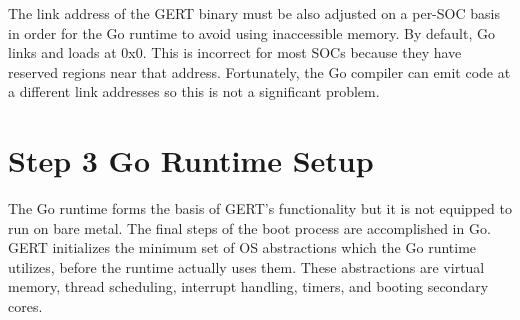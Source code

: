 The link address of the GERT binary must be also adjusted on a per-SOC basis in order for the Go
runtime to avoid using inaccessible memory. By default, Go links and loads at 0x0. This is incorrect
for most SOCs because they have reserved regions near that address. Fortunately, the Go compiler can
emit code at a different link addresses so this is not a significant problem.



\section{Step 3 Go Runtime Setup}

The Go runtime forms the basis of GERT's functionality but it is not equipped to
run on bare metal. The final steps of the boot process are accomplished in Go. GERT
initializes the minimum set of OS abstractions
which the Go runtime utilizes, before the runtime actually uses them. These abstractions are
virtual memory, thread scheduling, interrupt handling, timers, and booting secondary cores.



